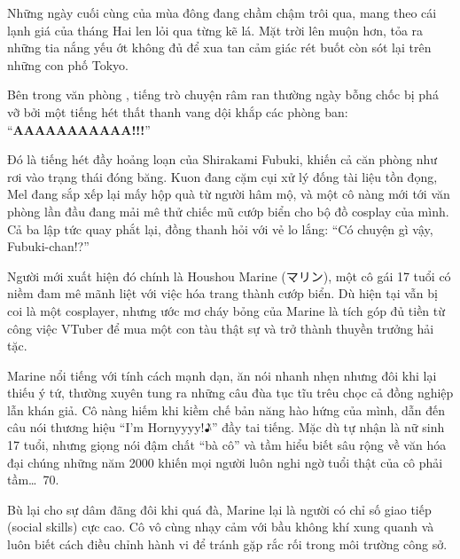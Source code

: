 \documentclass[../main.tex]{subfiles}
\begin{document}

Những ngày cuối cùng của mùa đông đang chầm chậm trôi qua, mang theo cái lạnh giá của tháng Hai len lỏi qua từng kẽ lá. Mặt trời lên muộn hơn, tỏa ra những tia nắng yếu ớt không đủ để xua tan cảm giác rét buốt còn sót lại trên những con phố Tokyo.

Bên trong văn phòng \hll, tiếng trò chuyện râm ran thường ngày bỗng chốc bị phá vỡ bởi một tiếng hét thất thanh vang dội khắp các phòng ban: ``\textbf{AAAAAAAAAAA!!!}''

Đó là tiếng hét đầy hoảng loạn của Shirakami Fubuki, khiến cả căn phòng như rơi vào trạng thái đóng băng. Kuon đang cặm cụi xử lý đống tài liệu tồn đọng, Mel đang sắp xếp lại mấy hộp quà từ người hâm mộ, và một cô nàng mới tới văn phòng lần đầu đang mải mê thử chiếc mũ cướp biển cho bộ đồ cosplay của mình. Cả ba lập tức quay phắt lại, đồng thanh hỏi với vẻ lo lắng: ``Có chuyện gì vậy, Fubuki-chan!?''

\chrint

Người mới xuất hiện đó chính là Houshou Marine (マリン), một cô gái 17 tuổi có niềm đam mê mãnh liệt với việc hóa trang thành cướp biển. Dù hiện tại vẫn bị coi là một cosplayer, nhưng ước mơ cháy bỏng của Marine là tích góp đủ tiền từ công việc VTuber để mua một con tàu thật sự và trở thành thuyền trưởng hải tặc.


Marine nổi tiếng với tính cách mạnh dạn, ăn nói nhanh nhẹn nhưng đôi khi lại thiếu ý tứ, thường xuyên tung ra những câu đùa tục tĩu trêu chọc cả đồng nghiệp lẫn khán giả. Cô nàng hiếm khi kiềm chế bản năng hào hứng của mình, dẫn đến câu nói thương hiệu ``I'm Hornyyyy!\~♪'' đầy tai tiếng. Mặc dù tự nhận là nữ sinh 17 tuổi, nhưng giọng nói đậm chất ``bà cô'' và tầm hiểu biết sâu rộng về văn hóa đại chúng những năm 2000 khiến mọi người luôn nghi ngờ tuổi thật của cô phải tầm\dots\ 70.

Bù lại cho sự dâm đãng đôi khi quá đà, Marine lại là người có chỉ số giao tiếp (social skills) cực cao. Cô vô cùng nhạy cảm với bầu không khí xung quanh và luôn biết cách điều chỉnh hành vi để tránh gặp rắc rối trong môi trường công sở.
\end{document}
